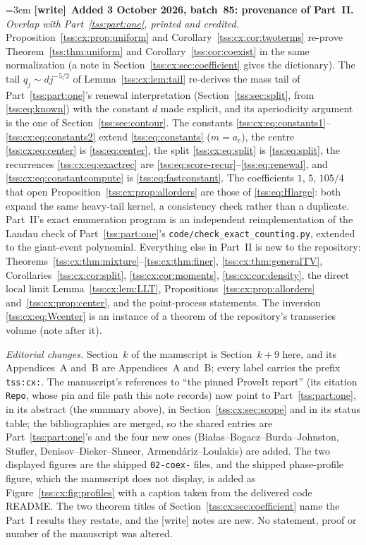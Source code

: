\documentclass[11pt]{article}
\theoremstyle{remark}\newtheorem{remark}[theorem]{Remark}
\theoremstyle{definition}\newtheorem{definition}[theorem]{Definition}
\newenvironment{writenote}[1][]{\par\smallskip\begingroup\small\emergencystretch=3em
 \noindent\textbf{[write]}\if\relax\detokenize{#1}\relax\else~\textbf{#1.}\fi\ }%
 {\par\endgroup\smallskip}
\begin{document}
\begin{writenote}[Added 3 October 2026, batch~85: provenance of Part~II]
\emph{Overlap with Part~\ref{tss:part:one}, printed and credited.}
Proposition~\ref{tss:cx:prop:uniform} and
Corollary~\ref{tss:cx:cor:twoterms} re-prove Theorem~\ref{tss:thm:uniform}
and Corollary~\ref{tss:cor:coexist} in the same normalization (a note in
Section~\ref{tss:cx:sec:coefficient} gives the dictionary). The tail
$q_j\sim dj^{-5/2}$ of Lemma~\ref{tss:cx:lem:tail} re-derives the mass tail
of Part~\ref{tss:part:one}'s renewal interpretation
(Section~\ref{tss:sec:split}, from \eqref{tss:eq:known}) with the constant
$d$ made explicit, and its aperiodicity argument is the one of
Section~\ref{tss:sec:contour}. The constants
\eqref{tss:cx:eq:constants1}--\eqref{tss:cx:eq:constants2} extend
\eqref{tss:eq:constants} ($m=a_c$), the centre \eqref{tss:cx:eq:center}
is \eqref{tss:eq:center}, the split \eqref{tss:cx:eq:split} is
\eqref{tss:eq:split}, the recurrences \eqref{tss:cx:eq:exactrec} are
\eqref{tss:eq:score-recur}--\eqref{tss:eq:renewal}, and
\eqref{tss:cx:eq:constantcompute} is \eqref{tss:eq:fastconstant}. The
coefficients $1$, $5$, $105/4$ that open
Proposition~\ref{tss:cx:prop:allorders} are those of
\eqref{tss:eq:Hlarge}: both expand the same heavy-tail kernel, a
consistency check rather than a duplicate. Part~II's exact enumeration
program is an independent reimplementation of the Landau check of
Part~\ref{tss:part:one}'s \texttt{code/\allowbreak check\_exact\_counting.py},
extended to the giant-event polynomial. Everything else in Part~II is new
to the repository: Theorems~\ref{tss:cx:thm:mixture}--\ref{tss:cx:thm:finer},
\ref{tss:cx:thm:generalTV}, Corollaries~\ref{tss:cx:cor:split},
\ref{tss:cx:cor:moments}, \ref{tss:cx:cor:density}, the direct local limit
Lemma~\ref{tss:cx:lem:LLT}, Propositions~\ref{tss:cx:prop:allorders}
and~\ref{tss:cx:prop:center}, and the point-process statements. The
inversion \eqref{tss:cx:eq:Wcenter} is an instance of a theorem of the
repository's transseries volume (note after it).

\emph{Editorial changes.} Section~$k$ of the manuscript is
Section~$k+9$ here, and its Appendices~A and~B are Appendices~A and~B;
every label carries the prefix \texttt{tss:cx:}. The manuscript's
references to ``the pinned ProveIt report'' (its citation \texttt{Repo},
whose pin and file path this note records) now point to
Part~\ref{tss:part:one}, in its abstract (the summary above), in
Section~\ref{tss:cx:sec:scope} and in its status table; the bibliographies
are merged, so the shared entries are Part~\ref{tss:part:one}'s and the
four new ones (Bia\l as--Bogacz--Burda--Johnston, Stufler,
Denisov--Dieker--Shneer, Armend\'ariz--Loulakis) are added. The two
displayed figures are the shipped \texttt{02-coex-} files, and the shipped
phase-profile figure, which the manuscript does not display, is added as
Figure~\ref{tss:cx:fig:profiles} with a caption taken from the delivered
code README. The two theorem titles of Section~\ref{tss:cx:sec:coefficient}
name the Part~I results they restate, and the \textsf{[write]} notes are
new. No statement, proof or number of the manuscript was altered.
\end{writenote}
\end{document}
